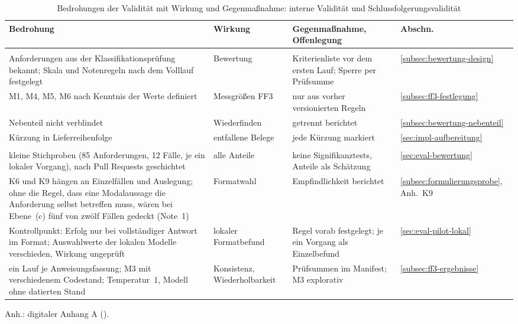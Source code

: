 \documentclass[11pt,a4paper]{report}
\begin{document}
\begin{table}[htbp]
  \centering
  \footnotesize
  \setlength{\tabcolsep}{4pt}
  \caption{Bedrohungen der Validität mit Wirkung und Gegenmaßnahme: interne
    Validität und Schlussfolgerungsvalidität}
  \label{tab:validitaet-2}
  \begin{tabular}{@{}>{\raggedright\arraybackslash}p{4.75cm}%
                    >{\raggedright\arraybackslash}p{3.4cm}%
                    >{\raggedright\arraybackslash}p{3.8cm}%
                    >{\raggedright\arraybackslash}p{1.2cm}@{}}
    \toprule
    \textbf{Bedrohung} & \textbf{Wirkung} & \textbf{Gegenmaßnahme,
      Offenlegung} & \textbf{Abschn.} \\
    \midrule
    \multicolumn{4}{@{}l}{\textit{Interne Validität}} \\
    85 Anforderungen aus der Klassifikationsprüfung bekannt; Skala und
      Notenregeln nach dem Volllauf festgelegt & Bewertung &
      Kriterienliste vor dem ersten Lauf; Sperre per Prüfsumme &
      \ref{subsec:bewertung-design} \\
    M1, M4, M5, M6 nach Kenntnis der Werte definiert & Messgrößen FF3 &
      nur aus vorher versionierten Regeln & \ref{subsec:ff3-festlegung} \\
    Nebenteil nicht verblindet & Wiederfinden & getrennt berichtet &
      \ref{subsec:bewertung-nebenteil} \\
    Kürzung in Lieferreihenfolge & entfallene Belege & jede Kürzung
      markiert & \ref{sec:impl-aufbereitung} \\
    \midrule
    \multicolumn{4}{@{}l}{\textit{Schlussfolgerungsvalidität}} \\
    kleine Stichproben (85 Anforderungen, 12 Fälle, je ein lokaler
      Vorgang), nach Pull Requests geschichtet & alle Anteile & keine
      Signifikanztests, Anteile als Schätzung & \ref{sec:eval-bewertung} \\
    K6 und K9 hängen an Einzelfällen und Auslegung; ohne die Regel, dass
      eine Modalaussage die Anforderung selbst betreffen muss, wären bei
      Ebene~(c) fünf von zwölf Fällen gedeckt (Note~1) & Formatwahl &
      Empfindlichkeit berichtet & \ref{subsec:formulierungsprobe},
      Anh.~K9 \\
    Kontrollpunkt: Erfolg nur bei vollständiger Antwort im Format;
      Auswahlwerte der lokalen Modelle verschieden, Wirkung ungeprüft &
      lokaler Formatbefund & Regel vorab festgelegt; je ein Vorgang als
      Einzelbefund & \ref{sec:eval-pilot-lokal} \\
    ein Lauf je Anweisungsfassung; M3 mit verschiedenem Codestand;
      Temperatur~1, Modell ohne datierten Stand & Konsistenz,
      Wiederholbarkeit & Prüfsummen im Manifest; M3 explorativ &
      \ref{subsec:ff3-ergebnisse} \\
    \bottomrule
  \end{tabular}

  \vspace{0.5em}
  \footnotesize\raggedright
  Anh.: digitaler Anhang A ().
\end{table}
\end{document}
